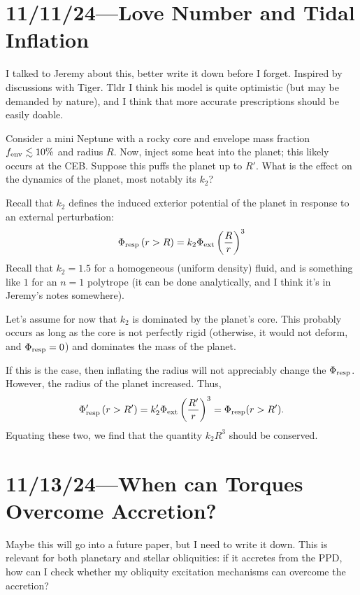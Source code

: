 \documentclass[12pt]{article}
\newcommand*{\p}[1]{\left(#1\right)}
\begin{document}
\section{11/11/24---Love Number and Tidal Inflation}

I talked to Jeremy about this, better write it down before I forget. Inspired by
discussions with Tiger. Tldr I think his model is quite optimistic (but may be
demanded by nature), and I think that more accurate prescriptions should be
easily doable.

Consider a mini Neptune with a rocky core and envelope mass fraction $f_{\rm
env} \lesssim 10\%$ and radius $R$.
Now, inject some heat into the planet; this likely occurs at the CEB\@.
Suppose this puffs the planet up to $R'$.
What is the effect on the dynamics of the planet, most notably its $k_2$?

Recall that $k_2$ defines the induced exterior potential of the planet in
response to an external perturbation:
\begin{equation}
    \Phi_{\rm resp}\p{r > R}
        = k_2\Phi_{\rm ext}\p{\frac{R}{r}}^3
\end{equation}
Recall that $k_2 = 1.5$ for a homogeneous (uniform density) fluid, and is
something like $1$ for an $n=1$ polytrope (it can be done analytically, and I
think it's in Jeremy's notes somewhere).

Let's assume for now that $k_2$ is dominated by the planet's core.
This probably occurs as long as the core is not perfectly rigid (otherwise, it
would not deform, and $\Phi_{\rm resp} = 0$) and dominates the mass of the
planet.

If this is the case, then inflating the radius will not appreciably change the
$\Phi_{\rm resp}$.
However, the radius of the planet increased.
Thus,
\begin{equation}
    \Phi_{\rm resp}'\p{r > R'}
        = k_2'\Phi_{\rm ext}\p{\frac{R'}{r}}^3 = \Phi_{\rm resp}(r > R').
\end{equation}
Equating these two, we find that the quantity $k_2R^3$ should be conserved.

\section{11/13/24---When can Torques Overcome Accretion?}

Maybe this will go into a future paper, but I need to write it down.
This is relevant for both planetary and stellar obliquities: if it accretes from
the PPD, how can I check whether my obliquity excitation mechanisms can overcome
the accretion?
\end{document}
